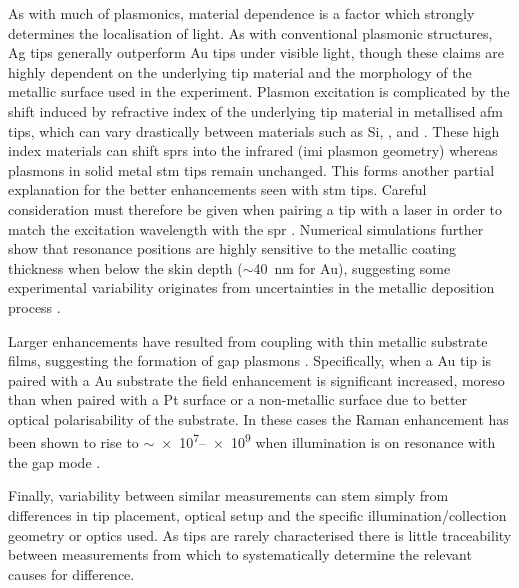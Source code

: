 \documentclass{article}
\begin{document}
As with much of plasmonics, material dependence is a factor which strongly determines the localisation of light. As with conventional plasmonic structures, Ag tips generally outperform Au tips under visible light, though these claims are highly dependent on the underlying tip material and the morphology of the metallic surface used in the experiment. Plasmon excitation is complicated by the shift induced by refractive index of the underlying tip material in metallised \gls{afm} tips, which can vary drastically between materials such as Si, , and  \cite{picardi2007, taguchi2009}. These high index materials can shift \glspl{spr} into the infrared {\color{red}(\gls{imi} plasmon geometry)} whereas plasmons in solid metal \gls{stm} tips remain unchanged. This forms another partial explanation for the better enhancements seen with \gls{stm} tips. Careful consideration must therefore be given when pairing a tip with a laser in order to match the excitation wavelength with the \gls{spr} \cite{yeo2006, yeo2007, cui2007, hayazawa2012}. Numerical simulations further show that resonance positions are highly sensitive to the metallic coating thickness when below the skin depth ($\sim$\SI{40}{nm} for Au), suggesting some experimental variability originates from uncertainties in the metallic deposition process \cite{huber2014}.

Larger enhancements have resulted from coupling with thin metallic substrate films, suggesting the formation of gap plasmons \cite{ren2004, hayazawa2007, yano2007, pettinger2009, uetsuki2012}. Specifically, when a Au tip is paired with a Au substrate the field enhancement is significant increased, moreso than when paired with a Pt surface \cite{ren2004} or a non-metallic surface \cite{downes2006} due to better optical polarisability of the substrate. In these cases the Raman enhancement has been shown to rise to $\sim$\num{e7}--\num{e9} when illumination is on resonance with the gap mode \cite{uetsuki2012}. %

Finally, variability between similar measurements can stem simply from differences in tip placement, optical setup and the specific illumination/collection geometry or optics used. As tips are rarely characterised there is little traceability between measurements from which to systematically determine the relevant causes for difference.
\end{document}
